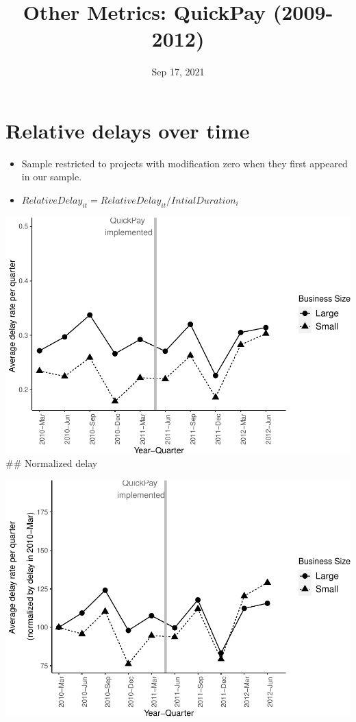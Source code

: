 \documentclass[
]{article}
\title{Other Metrics: QuickPay (2009-2012)}
\author{}
\date{\vspace{-2.5em}Sep 17, 2021}
\begin{document}
\maketitle

\hypertarget{relative-delays-over-time}{%
\section{Relative delays over time}\label{relative-delays-over-time}}

\begin{itemize}
\item
  Sample restricted to projects with modification zero when they first
  appeared in our sample.
\item
  \(RelativeDelay_{it} = RelativeDelay_{it}/IntialDuration_i\)
\end{itemize}

\includegraphics{qp_first_relative_delay_files/figure-latex/plot_relative_delay-1.pdf}
\#\# Normalized delay

\includegraphics{qp_first_relative_delay_files/figure-latex/normalized_plot-1.pdf}
\end{document}
